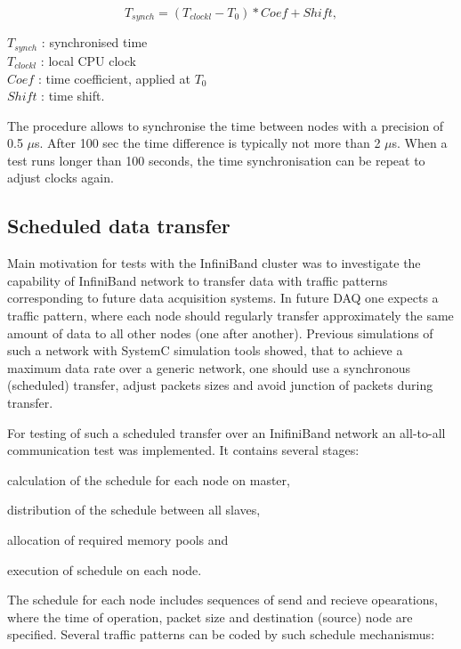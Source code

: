 \begin{equation}
\label{eq-CalibrTime}
T_{synch} = (T_{clockl} - T_{0}) * Coef + Shift,
\end{equation}

$T_{synch}$ : synchronised time\\
$T_{clockl}$ : local CPU clock\\ 
$Coef$ : time coefficient, applied at $T_{0}$\\
$Shift$ : time shift.

The procedure allows to synchronise the time between nodes with a precision of 0.5 $\mu$s.
After 100 sec the time difference is typically not more than 2 $\mu$s. 
When a test runs longer than 100 seconds, the 
time synchronisation can be repeat to adjust clocks again.

\subsection{Scheduled data transfer}

Main motivation for tests with the InfiniBand cluster was to 
investigate the capability of InfiniBand network
to transfer data with traffic patterns corresponding to future data acquisition systems. 
In future DAQ one expects a traffic pattern, 
where each node should regularly transfer approximately the same amount of data to all other nodes 
(one after another). 
Previous simulations of such a network with SystemC \cite{SystemC-home} simulation tools showed, 
that to achieve a maximum data rate over a generic network, 
one should use a synchronous (scheduled) transfer,
adjust packets sizes and avoid junction of packets during transfer.

For testing of such a scheduled transfer over an InifiniBand network 
an all-to-all communication test was implemented. 
It contains several stages:
\begin{compactenum}
\item calculation of the schedule for each node on master,
\item distribution of the schedule between all slaves,
\item allocation of required memory pools and
\item execution of schedule on each node.
\end{compactenum}
The schedule for each node includes sequences of send and recieve opearations, 
where the time of operation, packet size and 
destination (source) node are specified. 
Several traffic patterns can be coded by such schedule mechanismus:

